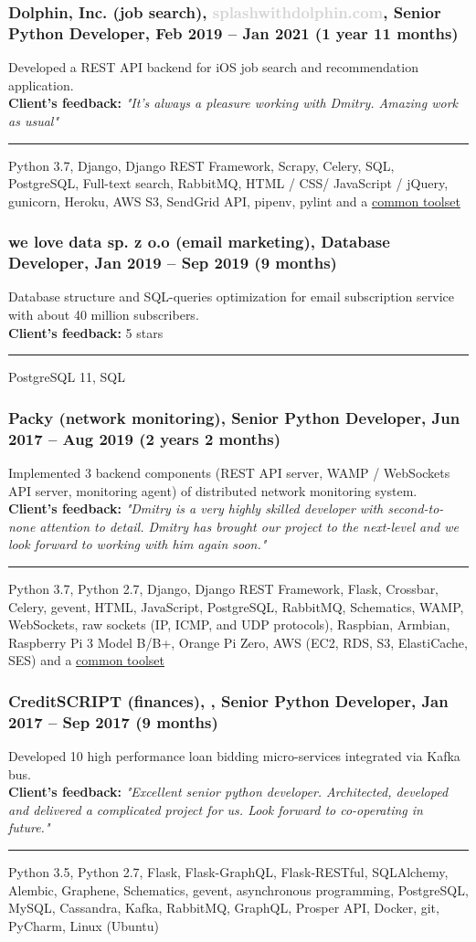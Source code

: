 \documentclass[a4paper,8pt]{extarticle}
\newcommand{\chref}[2]{\href{#1}{\underline{\smash{#2}}}}  %
\newcommand{\itchref}[2]{\chref{#1}{\textit{#2}}}  %
\newcommand{\chrule}{\vspace{3pt}\hrule}
\begin{document}
\subsubsection*{Dolphin, Inc. (job search), \textcolor{lightgray}{splashwithdolphin.com}, Senior Python Developer, Feb 2019 -- Jan 2021 (1 year 11 months)}
Developed a REST API backend for iOS job search and recommendation application.\\
\textbf{Client's feedback:} \textit{"It's always a pleasure working with Dmitry. Amazing work as usual"}
\chrule
Python 3.7, Django, Django REST Framework, Scrapy, Celery, SQL, PostgreSQL, Full-text search, RabbitMQ, HTML / CSS/ JavaScript / jQuery, gunicorn, Heroku, AWS S3, SendGrid API, pipenv, pylint and a \hyperlink{common-toolset}{common toolset}

\subsubsection*{we love data sp. z o.o (email marketing), Database Developer, Jan 2019 -- Sep 2019 (9 months)}
Database structure and SQL-queries optimization for email subscription service with about 40 million subscribers.\\
\textbf{Client's feedback:} 5 stars
\chrule
PostgreSQL 11, SQL

\subsubsection*{Packy (network monitoring), \textbf{Senior Python Developer}, Jun 2017 -- Aug 2019 (2 years 2 months)}
Implemented 3 backend components (REST API server, WAMP / WebSockets API server, monitoring agent) of distributed network monitoring system.\\
\textbf{Client's feedback:} \textit{"Dmitry is a very highly skilled developer with second-to-none attention to detail. Dmitry has brought our project to the next-level and we look forward to working with him again soon."}
\chrule
Python 3.7, Python 2.7, Django, Django REST Framework, Flask, Crossbar, Celery, gevent, HTML, JavaScript, PostgreSQL, RabbitMQ, Schematics, WAMP, WebSockets, raw sockets (IP, ICMP, and UDP protocols), Raspbian, Armbian, Raspberry Pi 3 Model B/B+, Orange Pi Zero, AWS (EC2, RDS, S3, ElastiCache, SES) and a \hyperlink{common-toolset}{common toolset}

\subsubsection*{CreditSCRIPT (finances), \itchref{https://www.creditscript.com}{www.creditscript.com}, Senior Python Developer, Jan 2017 -- Sep 2017 (9 months)}
Developed 10 high performance loan bidding micro-services integrated via Kafka bus.\\
\textbf{Client's feedback:} \textit{"Excellent senior python developer. Architected, developed and delivered a complicated project for us. Look forward to co-operating in future."}
\chrule
Python 3.5, Python 2.7, Flask, Flask-GraphQL, Flask-RESTful, SQLAlchemy, Alembic, Graphene, Schematics, gevent, asynchronous programming, PostgreSQL, MySQL, Cassandra, Kafka, RabbitMQ, GraphQL, Prosper API, Docker, git, PyCharm, Linux (Ubuntu)
\end{document}
